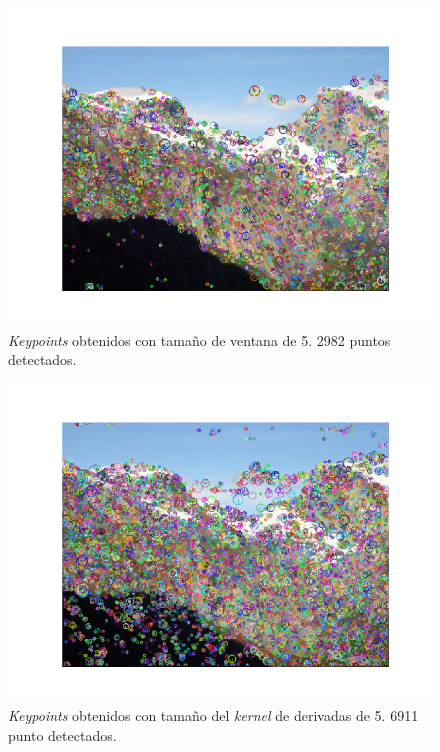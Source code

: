 \documentclass[11pt,a4paper]{article}
\begin{document}
\begin{figure}[H]
	\centering
	\includegraphics[scale=0.6]{img/kp-window}
	\caption{\textit{Keypoints} obtenidos con tamaño de ventana de 5. 2982 puntos detectados.}
	\label{fig:kp-window}
\end{figure}

\begin{figure}[H]
	\centering
	\includegraphics[scale=0.6]{img/kp-der}
	\caption{\textit{Keypoints} obtenidos con tamaño del \textit{kernel} de derivadas de 5. 6911 punto detectados.}
	\label{fig:kp-der}
\end{figure}
\end{document}
